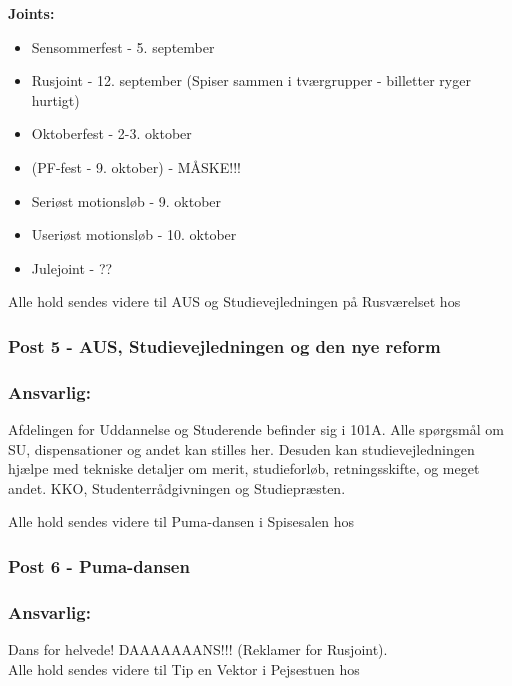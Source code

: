 \textbf{Joints:}
\begin{itemize}
  \item Sensommerfest - 5. september
  \item Rusjoint - 12. september (Spiser sammen i tværgrupper - billetter ryger hurtigt)
  \item Oktoberfest - 2-3. oktober
  \item (PF-fest - 9. oktober) - MÅSKE!!!
  \item Seriøst motionsløb - 9. oktober
  \item Useriøst motionsløb - 10. oktober
  \item Julejoint - ??
\end{itemize}

Alle hold sendes videre til AUS og Studievejledningen på Rusværelset hos \Mighty


\subsubsection*{\textbf{Post 5 - AUS, Studievejledningen og den nye reform}}
\subsubsection*{\textbf{Ansvarlig:} \Mighty}
Afdelingen for Uddannelse og Studerende befinder sig i 101A. Alle spørgsmål om SU, dispensationer og andet kan stilles her. Desuden kan studievejledningen hjælpe med tekniske detaljer om merit, studieforløb, retningsskifte, og meget andet.
KKO, Studenterrådgivningen og Studiepræsten.



Alle hold sendes videre til Puma-dansen i Spisesalen hos \Randildo


\subsubsection*{\textbf{Post 6 - Puma-dansen}}
\subsubsection*{\textbf{Ansvarlig:} \Randildo}
Dans for helvede! DAAAAAAANS!!! (Reklamer for Rusjoint). \\
Alle hold sendes videre til Tip en Vektor i Pejsestuen hos \Farav


